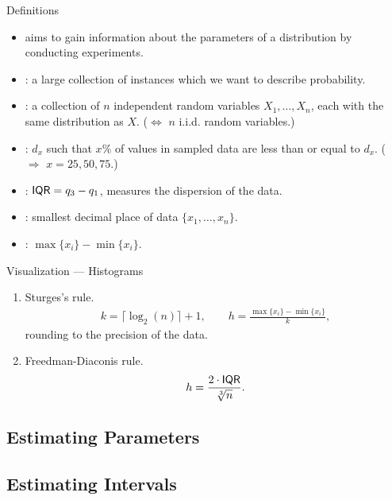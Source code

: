 \begin{frame}{Definitions}

\justifying
\begin{itemize}
	\justifying
	\item {} aims to gain information about the parameters of a distribution by conducting experiments.
	\item {}: a large collection of instances which we want to describe probability.
	\item {}: a collection of $n$ independent random variables $X_1, \ldots, X_n$, each with the same distribution as $X$. ($\Leftrightarrow$ $n$ i.i.d. random variables.)
	\item {}: $d_x$ such that $x\%$ of values in sampled data are less than or equal to $d_x$. ( $\Rightarrow$ $x = 25, 50, 75$.)
	\item {}: $\mathsf{IQR} = q_3 - q_1$, measures the dispersion of the data.
	\item {}: smallest decimal place of data $\{x_1, \ldots, x_n\}$.
	\item {}: $\max\{x_i\} - \min\{x_i\}$.
\end{itemize}


\end{frame}


\begin{frame}{Visualization --- Histograms}

\begin{enumerate}
	\item Sturges's rule.
	\begin{align*}
	k = \lceil \log_2(n)\rceil + 1, \qquad h = \frac{\max\{x_i\} - \min\{x_i\}}{k},
	\end{align*}
	rounding  to the precision of the data.
	\item Freedman-Diaconis rule.
	\begin{align*}
	h = \frac{2\cdot \mathsf{IQR}}{\sqrt[3]{n}}.
	\end{align*}
\end{enumerate}

\end{frame}

\subsection{Estimating Parameters}


\subsection{Estimating Intervals}